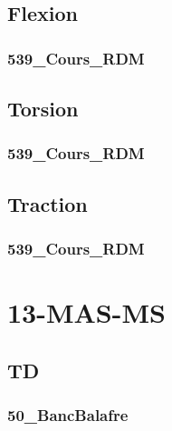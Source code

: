 \section{Flexion}

\subsection{539\_Cours\_RDM}
\graphicspath{{../12-RDM/TD/Flexion/539_Cours_RDM/images/}{../12-RDM/TD/Flexion/539_Cours_RDM/}{../Style/png/}}


\section{Torsion}

\subsection{539\_Cours\_RDM}
\graphicspath{{../12-RDM/TD/Torsion/539_Cours_RDM/images/}{../12-RDM/TD/Torsion/539_Cours_RDM/}{../Style/png/}}


\section{Traction}

\subsection{539\_Cours\_RDM}
\graphicspath{{../12-RDM/TD/Traction/539_Cours_RDM/images/}{../12-RDM/TD/Traction/539_Cours_RDM/}{../Style/png/}}


\clearpage
\chapter{13-MAS-MS}

\section{TD}

\subsection{50\_BancBalafre}
\graphicspath{{../13-MAS-MS/TD/50_BancBalafre/images/}{../13-MAS-MS/TD/50_BancBalafre/}{../Style/png/}}


